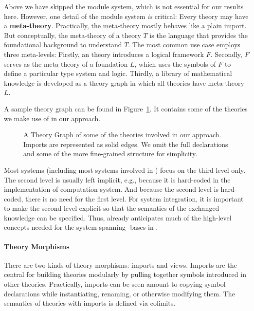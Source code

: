 

Above we have skipped the \MMT module system, which is not essential for our results here.
However, one detail of the \MMT module system \emph{is} critical: Every theory may have a \textbf{meta-theory}.
Practically, the meta-theory mostly behaves like a plain import.
But conceptually, the meta-theory of a theory $T$ is the language that provides the foundational background to understand $T$.
The most common use case employs three meta-levels: Firstly, an \MMT theory introduces a logical framework $F$.
Secondly, $F$ serves as the meta-theory of a foundation $L$, which uses the symbols of $F$ to define a particular type system and logic.
Thirdly, a library of mathematical knowledge is developed as a theory graph in which all theories have meta-theory $L$.

A sample theory graph can be found in Figure~\ref{fig:odk_theories}.
It contains some of the theories we make use of in our approach.

\begin{figure}[ht]\centering
  \providecommand\myxscale{3}
  \providecommand\myyscale{1.5}
  \providecommand\myfontsize{\footnotesize}
             
  \caption[Theories involved in our architecture]{A Theory Graph of some of the theories
    involved in our approach.  Imports are represented as solid edges.  We omit the full
    declarations and some of the more fine-grained structure for simplicity.  }
  \label{fig:odk_theories}
\end{figure}


Most systems (including most systems involved in \pn) focus on the third level only.
The second level is usually left implicit, e.g., because it is hard-coded in the implementation of computation system.
And because the second level is hard-coded, there is no need for the first level.
For system integration, it is important to make the second level explicit so that the semantics of the exchanged knowledge can be specified.
Thus, \MMT already anticipates much of the high-level concepts needed for the system-spanning \DKS-bases in \pn.

\paragraph{Theory Morphisms}
There are two kinds of theory morphisms: imports and views.
Imports are the central for building theories modularly by pulling together symbols introduced in other theories.
Practically, imports can be seen amount to copying symbol declarations while instantiating, renaming, or otherwise modifying them.
The semantics of theories with imports is defined via colimits.

